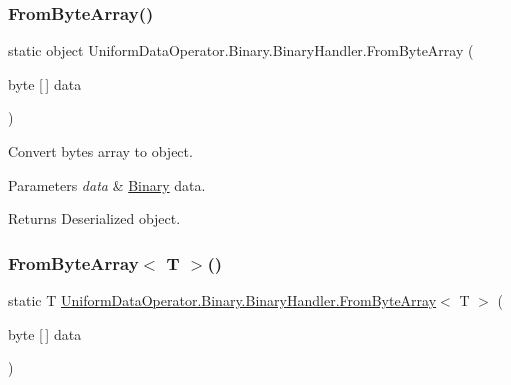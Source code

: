 \subsubsection{\texorpdfstring{From\+Byte\+Array()}{FromByteArray()}}
{\footnotesize\ttfamily static object Uniform\+Data\+Operator.\+Binary.\+Binary\+Handler.\+From\+Byte\+Array (\begin{DoxyParamCaption}\item[{byte \mbox{[}$\,$\mbox{]}}]{data }\end{DoxyParamCaption})\hspace{0.3cm}{\ttfamily [static]}}



Convert bytes array to object. 


\begin{DoxyParams}{Parameters}
{\em data} & \mbox{\hyperlink{namespace_uniform_data_operator_1_1_binary}{Binary}} data.\\
\hline
\end{DoxyParams}
\begin{DoxyReturn}{Returns}
Deserialized object.
\end{DoxyReturn}
\mbox{\label{class_uniform_data_operator_1_1_binary_1_1_binary_handler_a31772237797bd25f97b204b74289df70}} 
\subsubsection{\texorpdfstring{From\+Byte\+Array$<$ T $>$()}{FromByteArray< T >()}}
{\footnotesize\ttfamily static T \mbox{\hyperlink{class_uniform_data_operator_1_1_binary_1_1_binary_handler_ac3bd422de667147216fead7602828f3a}{Uniform\+Data\+Operator.\+Binary.\+Binary\+Handler.\+From\+Byte\+Array}}$<$ T $>$ (\begin{DoxyParamCaption}\item[{byte \mbox{[}$\,$\mbox{]}}]{data }\end{DoxyParamCaption})\hspace{0.3cm}{\ttfamily [static]}}



